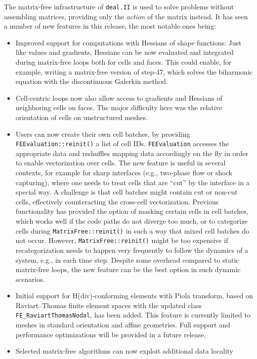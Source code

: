 \documentclass{ansarticle-preprint}
\newcommand{\specialword}[1]{\texttt{#1}}
\newcommand{\dealii}{{\specialword{deal.II}}\xspace}
\begin{document}
The matrix-free infrastructure of \dealii is used to solve problems
without assembling matrices, providing only the \textit{action} of the matrix
instead. It has seen a number of new features in this release, the most
notable ones being:
\begin{itemize}
\item Improved support for computations with Hessians of shape functions: Just like values and gradients, Hessians can be
now evaluated and integrated during matrix-free loops
both for cells and faces. This could enable, for example, writing
a matrix-free version of step-47, which solves the biharmonic equation with the discontinuous Galerkin method.
\item Cell-centric loops now also allow access to gradients and Hessians
of neighboring cells on faces. The major difficulty here was the relative orientation
of cells on unstructured meshes.
\item Users can now create their own cell batches, by providing \texttt{FEEvaluation::reinit()} a list of cell IDs. \texttt{FEEvaluation}
accesses the appropriate data and reshuffles mapping data accordingly on
the fly in order to enable vectorization over cells. The new feature is useful in several
contexts, for example for sharp interfaces (e.g., two-phase flow
or shock capturing), where one needs to treat cells that are ``cut'' by
the interface in a special way. A challenge is that cell batches
might contain cut or non-cut cells, effectively counteracting the cross-cell vectorization.
Previous functionality has provided the option of masking certain cells in cell batches, which works well if
the code paths do not diverge too much, or to
categorize cells during \texttt{MatrixFree::reinit()} in such a way that mixed cell batches do not occur. However, \texttt{MatrixFree::reinit()}
might be too expensive if recategorization needs to happen very frequently to follow the dynamics of a system, e.g., in each time step. Despite some overhead compared to static matrix-free loops, the new feature can be the best option in such dynamic scenarios.
\item Initial support for H(div)-conforming elements with Piola transform, based on Raviart--Thomas finite element spaces with the updated class \texttt{FE\_RaviartThomasNodal}, has been added. This feature is currently limited to meshes in standard orientation and affine geometries. Full support and performance optimizations will be provided in a future release.
\item Selected matrix-free algorithms can now exploit additional data locality

\end{itemize}
\end{document}
